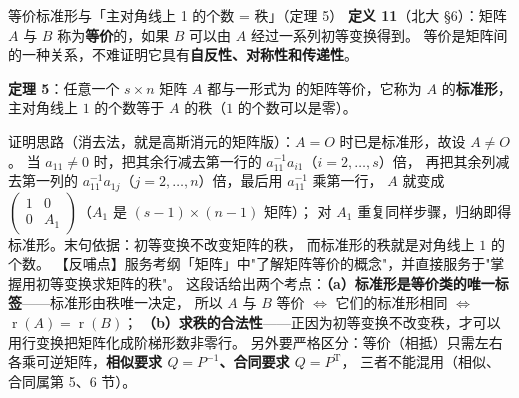 \begin{fdeep}{等价标准形与「主对角线上 1 的个数 = 秩」（定理 5）}
\textbf{定义 11}（北大 §6）：矩阵 $A$ 与 $B$ 称为\textbf{等价}的，如果 $B$ 可以由 $A$ 经过一系列初等变换得到。
等价是矩阵间的一种关系，不难证明它具有\textbf{自反性、对称性和传递性}。

\textbf{定理 5}：任意一个 $s\times n$ 矩阵 $A$ 都与一形式为
的矩阵等价，它称为 $A$ 的\textbf{标准形}，主对角线上 $1$ 的个数等于 $A$ 的秩（$1$ 的个数可以是零）。

证明思路（消去法，就是高斯消元的矩阵版）：$A=O$ 时已是标准形，故设 $A\ne O$。
当 $a_{11}\ne0$ 时，把其余行减去第一行的 $a_{11}^{-1}a_{i1}$（$i=2,\dots,s$）倍，
再把其余列减去第一列的 $a_{11}^{-1}a_{1j}$（$j=2,\dots,n$）倍，最后用 $a_{11}^{-1}$ 乘第一行，
$A$ 就变成 $\begin{pmatrix}1&0\\0&A_1\end{pmatrix}$（$A_1$ 是 $(s-1)\times(n-1)$ 矩阵）；
对 $A_1$ 重复同样步骤，归纳即得标准形。末句依据：初等变换不改变矩阵的秩，
而标准形的秩就是对角线上 $1$ 的个数。
【反哺点】服务考纲「矩阵」中"了解矩阵等价的概念"，并直接服务于"掌握用初等变换求矩阵的秩"。
这段话给出两个考点：\textbf{（a）标准形是等价类的唯一标签}——标准形由秩唯一决定，
所以 $A$ 与 $B$ 等价 $\iff$ 它们的标准形相同 $\iff$ $\operatorname{r}(A)=\operatorname{r}(B)$；
\textbf{（b）求秩的合法性}——正因为初等变换不改变秩，才可以用行变换把矩阵化成阶梯形数非零行。
另外要严格区分：等价（相抵）只需左右各乘可逆矩阵，\textbf{相似要求 $Q=P^{-1}$、合同要求 $Q=P^{\mathrm{T}}$}，
三者不能混用（相似、合同属第 5、6 节）。
\end{fdeep}

